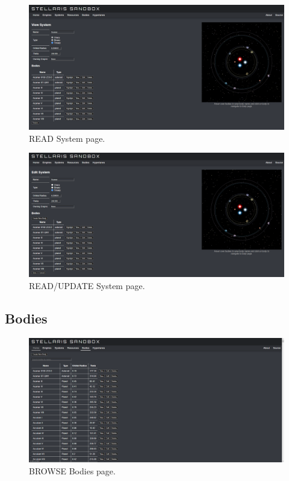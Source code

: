 \documentclass[12pt]{article}
\let\Oldsubsection\subsection
\renewcommand{\subsection}{\FloatBarrier\Oldsubsection}
\begin{document}
\begin{figure}[!ht]
  \caption{READ System page.}
  \includegraphics[width=\textwidth]{screenshots/systems/systems_read.png}
\end{figure}

\begin{figure}[!ht]
  \caption{READ/UPDATE System page.}
  \includegraphics[width=\textwidth]{screenshots/systems/systems_read_update.png}
\end{figure}

\newpage
\subsection{Bodies}

\begin{figure}[!ht]
  \caption{BROWSE Bodies page.}
  \includegraphics[width=\textwidth]{screenshots/bodies/bodies_browse.png}
\end{figure}
\end{document}
